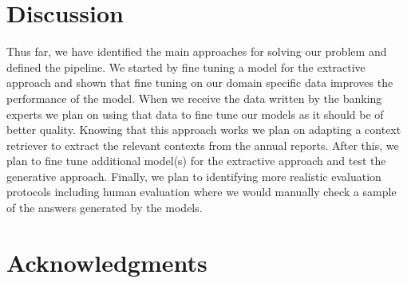 \documentclass[fleqn,moreauthors,10pt]{ds_report}
\begin{document}

\section*{Discussion}
Thus far, we have identified the main approaches for solving our problem and defined the pipeline.
We started by fine tuning a model for the extractive approach and shown that fine tuning on our domain specific data improves the performance of the model.
When we receive the data written by the banking experts we plan on using that data to fine tune our models as it should be of better quality.
Knowing that this approach works we plan on adapting a context retriever to extract the relevant contexts from the annual reports.
After this, we plan to fine tune additional model(s) for the extractive approach and test the generative approach.
Finally, we plan to identifying more realistic evaluation protocols including human evaluation where we would manually check a sample of the answers generated by the models.




\section*{Acknowledgments}





\end{document}
